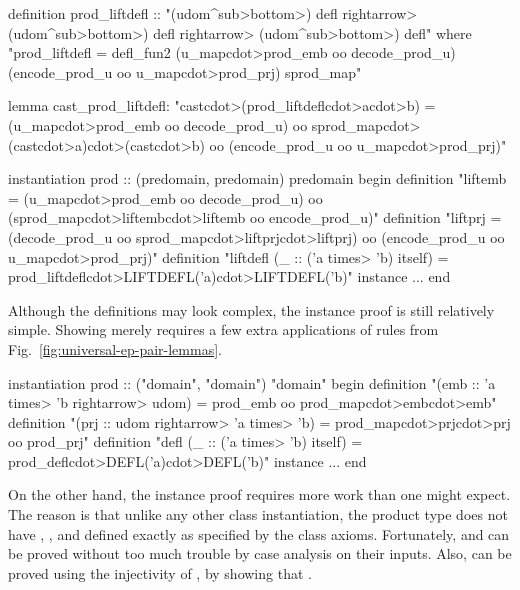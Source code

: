 \begin{isacode}
definition prod_liftdefl :: "(udom\<^sub>\<bottom>) defl \<rightarrow> (udom\<^sub>\<bottom>) defl \<rightarrow> (udom\<^sub>\<bottom>) defl"
  where "prod_liftdefl = defl_fun2 (u_map\<cdot>prod_emb oo decode_prod_u)
    (encode_prod_u oo u_map\<cdot>prod_prj) sprod_map"
\end{isacode}
\unmedskip
{}
\begin{isacode}
lemma cast_prod_liftdefl:
  "cast\<cdot>(prod_liftdefl\<cdot>a\<cdot>b) = (u_map\<cdot>prod_emb oo decode_prod_u) oo
    sprod_map\<cdot>(cast\<cdot>a)\<cdot>(cast\<cdot>b) oo (encode_prod_u oo u_map\<cdot>prod_prj)"
\end{isacode}
\unmedskip
\begin{isacode}
instantiation prod :: (predomain, predomain) predomain
begin
  definition "liftemb = (u_map\<cdot>prod_emb oo decode_prod_u)
      oo (sprod_map\<cdot>liftemb\<cdot>liftemb oo encode_prod_u)"
  definition "liftprj = (decode_prod_u oo sprod_map\<cdot>liftprj\<cdot>liftprj)
      oo (encode_prod_u oo u_map\<cdot>prod_prj)"
  definition "liftdefl (_ :: ('a \<times> 'b) itself) =
      prod_liftdefl\<cdot>LIFTDEFL('a)\<cdot>LIFTDEFL('b)"
  instance ...
end
\end{isacode}
%
Although the definitions may look complex, the  instance proof is still relatively simple. Showing  merely requires a few extra applications of rules from Fig.~\ref{fig:universal-ep-pair-lemmas}.
%
\begin{isacode}
instantiation prod :: ("domain", "domain") "domain"
begin
  definition "(emb :: 'a \<times> 'b \<rightarrow> udom) = prod_emb oo prod_map\<cdot>emb\<cdot>emb"
  definition "(prj :: udom \<rightarrow> 'a \<times> 'b) = prod_map\<cdot>prj\<cdot>prj oo prod_prj"
  definition "defl (_ :: ('a \<times> 'b) itself) = prod_defl\<cdot>DEFL('a)\<cdot>DEFL('b)"
  instance ...
end
\end{isacode}
%
On the other hand, the  instance proof requires more work than one might expect. The reason is that unlike any other  class instantiation, the product type does not have , , and  defined exactly as specified by the  class axioms. Fortunately,  and  can be proved without too much trouble by case analysis on their inputs. Also,  can be proved using the injectivity of , by showing that .

